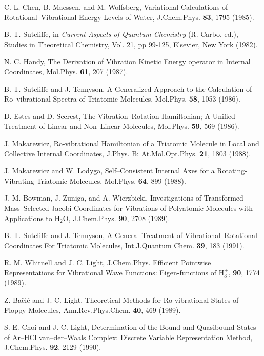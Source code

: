\begin{thebibliography}{999}
C.-L. Chen, B. Maessen, and M. Wolfsberg, 
Variational Calculations of Rotational--Vibrational Energy
Levels of Water,
J.Chem.Phys. {\bf 83}, 1795 
(1985).

B. T. Sutcliffe, in {\em Current Aspects of Quantum Chemistry}
(R. Carbo, ed.), Studies in Theoretical Chemistry, Vol. 21,
pp 99-125, Elsevier, New York (1982).

N. C. Handy, 
The Derivation of Vibration Kinetic Energy
operator in Internal Coordinates,
Mol.Phys. {\bf 61}, 207 (1987).

B. T. Sutcliffe and J. Tennyson, 
A Generalized Approach to the Calculation of Ro--vibrational Spectra
of Triatomic Molecules,
Mol.Phys. {\bf 58}, 1053 (1986).

D. Estes and D. Secrest, 
The Vibration--Rotation Hamiltonian; A Unified
Treatment of Linear and Non--Linear Molecules,
Mol.Phys. {\bf 59}, 569 (1986).

J. Makarewicz, 
Ro-vibrational Hamiltonian of a Triatomic Molecule in 
Local and Collective Internal Coordinates,
J.Phys. B: At.Mol.Opt.Phys. {\bf 21}, 1803 (1988).

J. Makarewicz and W. Lodyga, 
Self--Consistent Internal Axes for a Rotating-Vibrating
Triatomic Molecules,
Mol.Phys. {\bf 64}, 899 (1988).

J. M. Bowman, J. Zuniga, and A. Wierzbicki, 
Investigations of Transformed Mass--Selected Jacobi Coordinates
for Vibrations of Polyatomic Molecules with Applications to H$_2$O,
J.Chem.Phys. {\bf 90}, 2708 (1989).

B. T. Sutcliffe and J. Tennyson, 
A General Treatment of Vibrational--Rotational Coordinates
For Triatomic Molecules,
Int.J.Quantum Chem. {\bf 39},
183 (1991).

R. M. Whitnell and J. C. Light, J.Chem.Phys. 
Efficient Pointwise Representations for
Vibrational Wave Functions: Eigen-functions of H$_3^+$,
{\bf 90}, 1774 (1989).

Z. Ba\u{c}i\'{c} and J. C. Light, 
Theoretical Methods for Ro-vibrational States of Floppy 
Molecules,
Ann.Rev.Phys.Chem. {\bf 40}, 
469 (1989).

S. E. Choi and J. C. Light, 
Determination of the Bound and Quasibound States of Ar--HCl
van--der--Waals Complex:
Discrete Variable Representation Method,
J.Chem.Phys. {\bf 92}, 2129 (1990).


\end{thebibliography}

